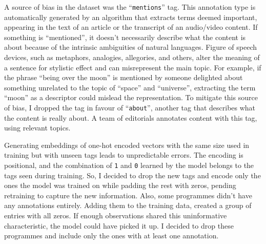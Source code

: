 A source of bias in the dataset was the ``\verb|mentions|'' tag. This annotation type is automatically generated by an algorithm that extracts
terms deemed important, appearing in the text of an article or the transcript of an audio/video content.
If something is ``mentioned'', it doesn't necessarily describe what the content is about because of the intrinsic ambiguities of natural languages.
Figure of speech devices, such as metaphors, analogies, allegories, and others, alter the meaning of a sentence for stylistic effect and can misrepresent the main topic.
For example, if the phrase ``being over the moon'' is mentioned
by someone delighted about something unrelated to the topic of ``space'' and ``universe'',
extracting the term ``moon'' as a descriptor could mislead the representation.
To mitigate this source of bias, I dropped the tag in favour of ``\verb|about|'', another tag that describes what the content is really about.
A team of editorials annotates content with this tag, using relevant topics.

Generating embeddings of one-hot encoded vectors with the same size used in training but with
unseen tags leads to unpredictable errors.
The encoding is positional, and the combination of \verb|1| and \verb|0| learned by the model
belongs to the tags seen during training. So, I decided to drop the new tags and encode only the ones the model was trained on
while padding the rest with zeros, pending retraining to capture the new information.
Also, some programmes didn't have any annotations entirely. Adding them to the training data, created a group of entries with all zeros.
If enough observations shared this uninformative characteristic, the model could have picked it up.
I decided to drop these programmes and include only the ones with at least one annotation.
